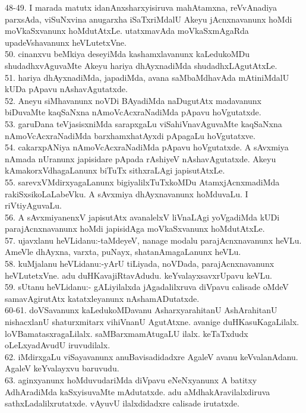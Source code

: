 \documentclass{article}
\begin{document}
48-49. I marada matutx idanAnxsharxyisiruva mahAtamxna, reVvAnadiya parxsAda, viSuNxvina anugarxha iSaTxriMdalU Akeyu jAcnxnavanunx hoMdi moVkaSxvanunx hoMdutAtxLe. utatxmavAda moVkaSxmAgaRda upadeVshavanunx heVLutetxVne.\\
50. cinanxvu beMkiya deseyiMda kashamxlavanunx kaLedukoMDu shudadhxvAguvaMte Akeyu hariya dhAyxnadiMda shudadhxLAgutAtxLe.\\
51. hariya dhAyxnadiMda, japadiMda, avana saMbaMdhavAda mAtiniMdalU kUDa pApavu nAshavAgutatxde.\\
52. Aneyu siMhavanunx noVDi BAyadiMda naDugutAtx madavanunx biDuvaMte kaqSaNxna nAmoVcAcxraNadiMda pApavu hoVgutatxde.\\
53. garuDana teVjasisxniMda sarapxgaLu viSahiVnavAguvaMte kaqSaNxna nAmoVcAcxraNadiMda barxhamxhatAyxdi pApagaLu hoVgutatxve.\\
54. cakarxpANiya nAmoVcAcxraNadiMda pApavu hoVgutatxde. A sAvxmiya nAmada nUranunx japisidare pApada rAshiyeV nAshavAgutatxde. Akeyu kAmakorxVdhagaLanunx biTuTx sithxraLAgi japisutAtxLe.\\
55. sarevxVMdirxyagaLanunx bigiyalilxTuTxkoMDu AtamxjAcnxmadiMda rakiSxsikoLaLabeVku. A sAvxmiya dhAyxnavanunx hoMduvaLu. I riVtiyAguvaLu.\\
56. A sAvxmiyanenxV japisutAtx avanalelxV liVnaLAgi yoVgadiMda kUDi parajAcnxnavanunx hoMdi japisidAga moVkaSxvanunx hoMdutAtxLe.\\
57. ujavxlanu heVLidanu:-taMdeyeV, nanage modalu parajAcnxnavanunx heVLu. AmeVle dhAyxna, varxta, puNayx, shatanAmagaLanunx heVLu.\\
58. kuMjalanu heVLidanu:-yArU tiLiyada, noVDada, parajAcnxnavanunx heVLutetxVne. adu duHKavajiRtavAdudu. keYvalayxsavxrUpavu keVLu.\\
59. sUtanu heVLidanu:- gALiyilalxda jAgadalilxruva diVpavu calisade oMdeV samavAgirutAtx katatxleyanunx nAshamADutatxde.\\
60-61. doVSavanunx kaLedukoMDavanu AsharxyarahitanU AshArahitanU nishacxlanU shaturxmitarx vihiVnanU AgutAtxne. avanige duHKasuKagaLilalx. loVBamatasxragaLilalx. saMBarxmamAtugaLU ilalx. keTaTxdudx oLeLxyadAvudU iruvudilalx.\\
62. iMdirxgaLu viSayavanunx anuBavisadidadxre AgaleV avanu keVvalanAdanu. AgaleV keYvalayxvu baruvudu.\\
63. aginxyanunx hoMduvudariMda diVpavu eNeNxyanunx A batitxy AdhAradiMda kaSxyisuvaMte mAdutatxde. adu aMdhakAravilalxdiruva sathxLadalilxrutatxde. vAyuvU ilalxdidadxre calisade irutatxde.\\
\end{document}
